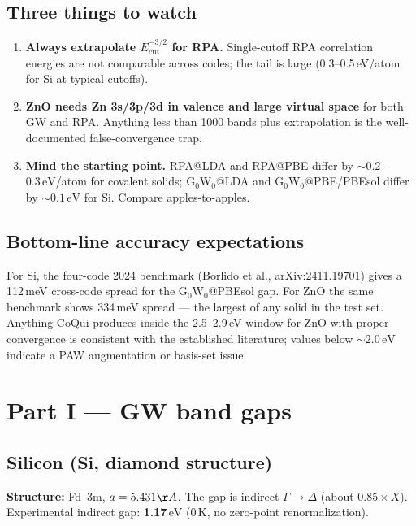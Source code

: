 \documentclass[11pt]{article}
\newcommand{\eV}{\ensuremath{\,\mathrm{eV}}}
\newcommand{\target}[1]{\textbf{\textcolor{blue!60!black}{#1}}}
\begin{document}
\subsection{Three things to watch}

\begin{enumerate}
  \item \textbf{Always extrapolate $E_{\mathrm{cut}}^{-3/2}$ for RPA.}
  Single-cutoff RPA correlation energies are not comparable across codes;
  the tail is large (0.3--0.5\,eV/atom for Si at typical cutoffs).
  \item \textbf{ZnO needs Zn 3s/3p/3d in valence and large virtual space}
  for both GW and RPA. Anything less than 1000 bands plus extrapolation
  is the well-documented false-convergence trap.
  \item \textbf{Mind the starting point.} RPA@LDA and RPA@PBE differ by
  $\sim 0.2$--$0.3\eV$/atom for covalent solids; G$_0$W$_0$@LDA and
  G$_0$W$_0$@PBE/PBEsol differ by $\sim 0.1\eV$ for Si. Compare
  apples-to-apples.
\end{enumerate}

\subsection{Bottom-line accuracy expectations}

For Si, the four-code 2024 benchmark (Borlido et al., arXiv:2411.19701)
gives a 112\,meV cross-code spread for the G$_0$W$_0$@PBEsol gap. For ZnO
the same benchmark shows 334\,meV spread --- the largest of any solid in
the test set. Anything CoQui produces inside the 2.5--2.9\,eV window for
ZnO with proper convergence is consistent with the established
literature; values below $\sim 2.0\eV$ indicate a PAW augmentation or
basis-set issue.

\newpage
\section{Part I --- GW band gaps}

\subsection{Silicon (Si, diamond structure)}

\textbf{Structure:} Fd--3m, $a = 5.431\AA$. The gap is indirect
$\Gamma \to \Delta$ (about $0.85 \times X$). Experimental indirect gap:
\target{1.17\eV} (0\,K, no zero-point renormalization).
\end{document}

